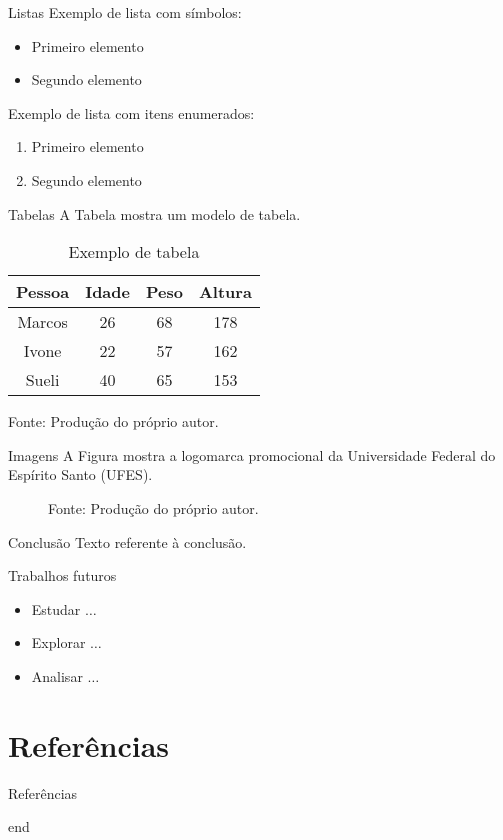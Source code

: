 \documentclass[11pt]{beamer}
\begin{document}
    \begin{frame}{Listas}
        Exemplo de lista com símbolos:
        \begin{itemize}
            \item Primeiro elemento
            \item Segundo elemento
        \end{itemize}
        \bigskip
        Exemplo de lista com itens enumerados:
        \begin{enumerate}
            \item Primeiro elemento
            \item Segundo elemento
        \end{enumerate}
    \end{frame}
    \begin{frame}{Tabelas}
        A Tabela mostra um modelo de tabela.
        \begin{table}[htb]
            \caption{Exemplo de tabela}
            \label{tab:modelo_tabela}
            \centering
            \begin{tabular}{c|c|c|c}
                \hline
                \textbf{Pessoa} & \textbf{Idade} & \textbf{Peso} & \textbf{Altura} \\ \hline
                Marcos & 26    & 68   & 178    \\ \hline
                Ivone  & 22    & 57   & 162    \\ \hline
                Sueli  & 40    & 65   & 153    \\ \hline
            \end{tabular}

            \medskip

            Fonte: Produção do próprio autor.
        \end{table}
    \end{frame}
    \begin{frame}{Imagens}
        A Figura mostra a logomarca promocional da Universidade Federal do Espírito Santo (UFES).
        \begin{figure}[htb]
            \medskip

            Fonte: Produção do próprio autor.
        \end{figure}
    \end{frame}
    \begin{frame}{Conclusão}
        Texto referente à conclusão.
    \end{frame}
    \begin{frame}{Trabalhos futuros}
        \begin{itemize}
            \item Estudar $\ldots$
            \medskip
            \item Explorar $\ldots$
            \medskip
            \item Analisar $\ldots$
        \end{itemize}
    \end{frame}

\section{Referências}
    \begin{frame}{Referências}
        
    \end{frame}
    \begin{frame}
        end
    \end{frame}
\end{document}
